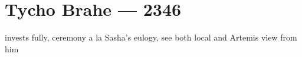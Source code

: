 \hypertarget{tycho-brahe-2346}{%
\chapter{Tycho Brahe — 2346}\label{tycho-brahe-2346}}

invests fully, ceremony a la Sasha's eulogy, see both local and Artemis view from him
